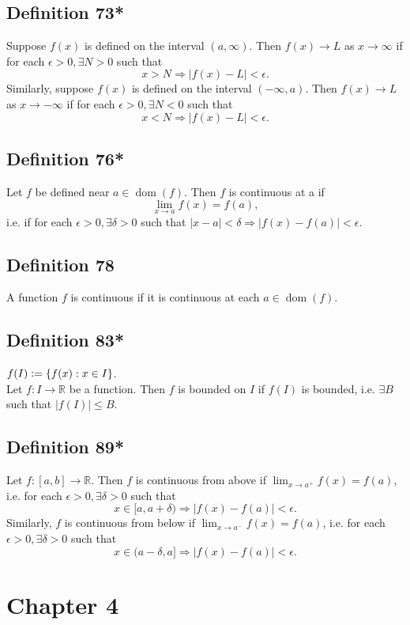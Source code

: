 \documentclass{article}
\DeclareMathOperator\dom{dom}
\begin{document}
\subsection{Definition 73*}
Suppose $f(x)$ is defined on the interval $(a, \infty)$. Then $f(x) \to L$
as $x \to \infty$ if for each $\epsilon > 0, \exists N>0$ such that \[
x>N \Longrightarrow |f(x)-L|<\epsilon.
\]
Similarly, suppose $f(x)$ is defined on the interval $(-\infty, a)$. Then $f(x) \to L$
as $x \to -\infty$ if for each $\epsilon > 0, \exists N<0$ such that \[
x<N \Longrightarrow |f(x)-L|<\epsilon.
\]
\subsection{Definition 76*}
Let $f$ be defined near $a \in \dom(f)$. Then $f$ is continuous at a if \[
\lim_{x \to a}f(x) = f(a),
\]
i.e. if for each $\epsilon>0, \exists \delta > 0$ such that
$|x-a|<\delta \Longrightarrow |f(x)-f(a)|<\epsilon.$

\subsection{Definition 78}
A function $f$ is continuous if it is continuous at each $a \in \dom(f)$.

\subsection{Definition 83*}
$f(I) \vcentcolon = \{ f(x) : x \in I \}$. \\
\newline
Let $f: I \to \mathbb{R}$ be a function. Then $f$ is bounded on $I$ if $f(I)$ is bounded, i.e.
$\exists B$ such that $|f(I)|\leq B$.

\subsection{Definition 89*}
Let $f:[a,b] \to \mathbb{R}$. Then $f$ is continuous from above if $\lim_{x \to a^+}f(x) = f(a)$, i.e.
for each $\epsilon>0, \exists \delta>0$ such that \[
x \in [a, a+\delta) \Longrightarrow |f(x)-f(a)|<\epsilon.
\]
Similarly, $f$ is continuous from below if $\lim_{x \to a^-}f(x) = f(a)$, i.e.
for each $\epsilon>0, \exists \delta>0$ such that \[
x \in (a-\delta, a] \Longrightarrow |f(x)-f(a)|<\epsilon.
\]
\newpage{}
\section*{Chapter 4}
\end{document}
